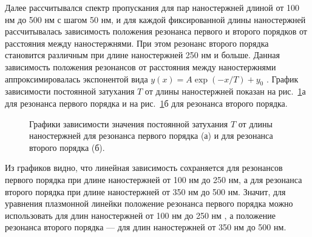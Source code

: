 Далее рассчитывался спектр пропускания для пар наностержней длиной от 100 нм до 500 нм с шагом 50 нм, и для каждой фиксированной длины наностержней рассчитывалась зависимость положения резонанса первого и второго порядков от расстояния между наностержнями. При этом резонанс второго порядка становится различным при длине наностержней 250 нм и больше. Данная зависимость положения резонансов от расстояния между наностержнями аппроксимировалась экспонентой вида $ y(x) = A \exp (-x/ T ) + y_0 $ . График зависимости постоянной затухания $ T $ от длины наностержней показан на рис.~\ref{img:expdecay}а для резонанса первого порядка и на рис.~\ref{img:expdecay}б для резонанса второго порядка.

\begin{figure}
\caption{Графики зависимости значения постоянной затухания $ T $ от длины наностержней для резонанса первого порядка (а) и для резонанса второго порядка (б).}
\label{img:expdecay}
\end{figure}

Из графиков видно, что линейная зависимость сохраняется для резонансов первого порядка при длине наностержней от 100 нм до 250 нм, а для резонанса второго порядка при длине наностержней от 350 нм до 500 нм. Значит, для уравнения плазмонной линейки положение резонанса первого порядка можно использовать для длин наностержней от 100 нм до 250 нм  , а положение резонанса второго порядка --- для длин наностержней от 350 нм до 500 нм.

